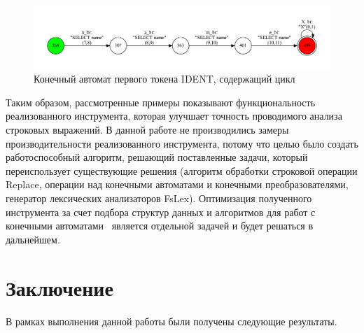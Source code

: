 \documentclass{matmex-diploma}
\begin{document}
\begin{figure}[h!]
\begin{center}
\includegraphics[width=1.0\textwidth]{token}
\caption{Конечный автомат первого токена IDENT, содержащий цикл}
\label{fig:token} 
\end{center}
\end{figure}



Таким образом, рассмотренные примеры показывают функциональность реализованного инструмента, которая улучшает точность проводимого анализа строковых выражений. В данной работе не производились замеры производительности реализованного инструмента, потому что целью было создать работоспособный алгоритм, решающий поставленные задачи, который переиспользует существующие решения (алгоритм обработки строковой операции Replace, операции над конечными автоматами и конечными преобразователями, генератор лексических анализаторов FsLex). Оптимизация полученного инструмента за счет подбора структур данных и алгоритмов для работ с конечными автоматами~\cite{AlgoFSA} является отдельной задачей и будет решаться в дальнейшем. 


\section*{Заключение}
В рамках выполнения данной работы были получены следующие результаты.
\end{document}
